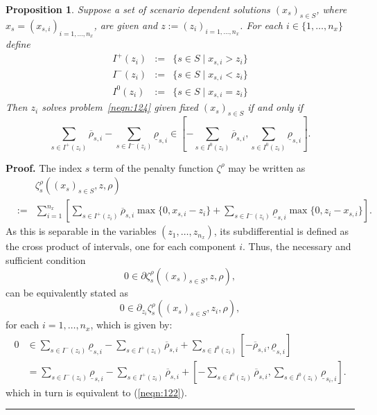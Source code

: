 \documentclass[preprint, 1p, review]{elsarticle}
\newtheorem{proposition}[theorem]{Proposition}
\newenvironment{proof}[1][Proof]{\noindent\textbf{#1.} }{\ \rule{0.5em}{0.5em}}
\begin{document}
\begin{proposition}
Suppose a set of scenario dependent solutions $ (x_s)_{s\in S}$, 
where $x_s =(x_{s,i})_{i=1,\dots,n_x} $, are given 
and $z:=(z_i)_{i=1,\dots, n_x}$.  For each $i \in \{1,\dots,n_x\}$ define 
%
\begin{eqnarray*}
I^{+} (z_i) & := & \{s \in S \mid x_{s,i} > z_i \} \\
I^{-} (z_i) & := & \{s \in S \mid x_{s,i} < z_i\} \\
I^{0} (z_i) & := & \{s \in S \mid x_{s,i} = z_i\}
\end{eqnarray*}
%
Then $z_i$ solves problem~\eqref{neqn:124} given fixed $(x_s)_{s\in S}$ if and only if
\begin{equation}
\sum_{s \in I^{+} (z_i)} \overline{\rho}_{s,i} - \sum_{s \in I^{-} (z_i)} \underline{\rho}_{s,i}  \in \left[ -\sum_{s \in I^{0} (z_i)}\overline{\rho}_{s,i},\sum_{s \in I^{0} (z_i)}\underline{\rho}_{s,i}  \right].  \label{neqn:122}
\end{equation}
\end{proposition}

\begin{proof}
	The index $s$ term of the penalty function $\zeta^\rho$ may be written as 
\begin{eqnarray*}
&&\zeta^\rho_s((x_s)_{s\in S} ,z,\rho) \\
&:=& \sum_{i=1}^{n_x} \left[ \sum_{s \in I^{+} (z_i)} \overline{\rho}_{s,i}  \max\{0, x_{s,i} - z_i\}
+  \sum_{s \in I^{-} (z_i)} \underline{\rho}_{s,i} \max\{0, z_i - x_{s,i}\} \right].
\end{eqnarray*}
As this is separable in the variables $(z_1, \dots, z_{n_x})$, its subdifferential is defined as the cross product of intervals, one for each component $i$. Thus, the necessary and sufficient condition 
$$0 \in \partial \zeta^\rho_s((x_s)_{s\in S} , z, \rho),$$ can be equivalently stated as 
$$0 \in \partial_{z_i} \zeta^\rho_s((x_s)_{s\in S} ,z_i,\rho),$$
for each $i =1,\dots,n_x$, which is given by:
\begin{align*}
0 &\in  \sum_{s \in I^{-} (z_i )} \underline{\rho}_{s,i} -\sum_{s \in I^{+}(z_i)} \overline{\rho}_{s,i}  + \sum_{s \in I^{0} (z_i)}\left[-\overline{\rho}_{s,i} , \underline{\rho}_{s,i}\right] \\
&= \sum_{s \in I^{-} (z_i )} \underline{\rho}_{s,i} -\sum_{s \in I^{+}(z_i)} \overline{\rho}_{s,i}  + \left[-\sum_{s \in I^{0} (z_i)}\overline{\rho}_{s,i} , \sum_{s \in I^{0} (z_i)}\underline{\rho}_{s_i,i}\right].
\end{align*}
which in turn is equivalent to (\ref{neqn:122}).
\end{proof}
\end{document}
